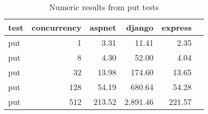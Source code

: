 \FloatBarrier
\begin{table}[!htp]\centering
    \caption{Numeric results from put tests}\label{tab:resultsPut}
    \scriptsize
    \begin{tabular}{lrrrrr}\toprule
        test & concurrency & aspnet & django   & express \\\midrule
        put  & 1           & 3.31   & 11.41    & 2.35    \\
        put  & 8           & 4.30   & 52.00    & 4.04    \\
        put  & 32          & 13.98  & 174.60   & 13.65   \\
        put  & 128         & 54.19  & 680.64   & 54.28   \\
        put  & 512         & 213.52 & 2,891.46 & 221.57  \\
        \bottomrule
    \end{tabular}
\end{table}
\FloatBarrier
